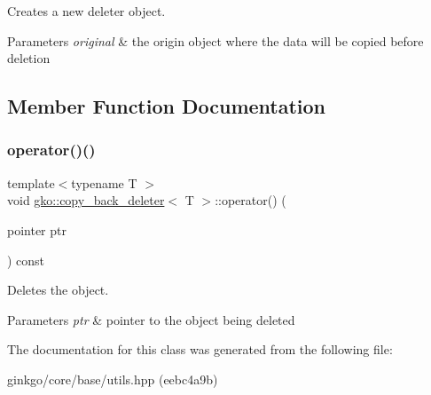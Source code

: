 Creates a new deleter object. 


\begin{DoxyParams}{Parameters}
{\em original} & the origin object where the data will be copied before deletion \\
\hline
\end{DoxyParams}


\subsection{Member Function Documentation}
\mbox{\label{classgko_1_1copy__back__deleter_a34bba76c78c23dccd814969e98c78b1b}} 
\subsubsection{\texorpdfstring{operator()()}{operator()()}}
{\footnotesize\ttfamily template$<$typename T $>$ \\
void \hyperlink{classgko_1_1copy__back__deleter}{gko\+::copy\+\_\+back\+\_\+deleter}$<$ T $>$\+::operator() (\begin{DoxyParamCaption}\item[{pointer}]{ptr }\end{DoxyParamCaption}) const\hspace{0.3cm}{\ttfamily [inline]}}



Deletes the object. 


\begin{DoxyParams}{Parameters}
{\em ptr} & pointer to the object being deleted \\
\hline
\end{DoxyParams}


The documentation for this class was generated from the following file\+:\begin{DoxyCompactItemize}
\item 
ginkgo/core/base/utils.\+hpp (eebc4a9b)\end{DoxyCompactItemize}
